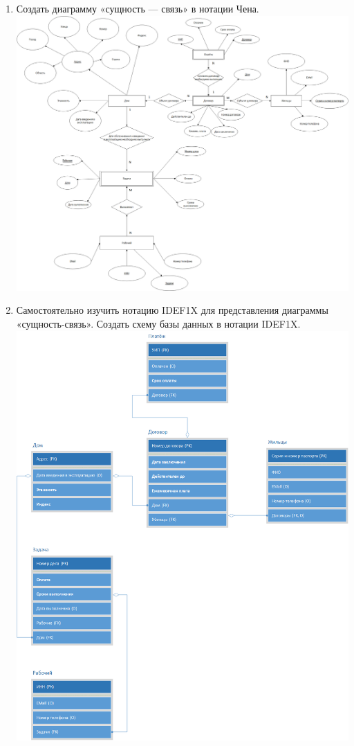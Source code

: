 \documentclass[a4paper,14pt]{extarticle}
\begin{document}
\begin{enumerate}[1.]
    \item Создать диаграмму «сущность — связь» в нотации Чена.\\
    \includegraphics[width=180mm]{db_task2}\\

    \item Самостоятельно изучить нотацию IDEF1X для представления диаграммы «сущность-связь». Создать схему базы данных в нотации IDEF1X. \\
    \includegraphics[width=180mm]{db_task3}\\


\end{enumerate}
\end{document}
